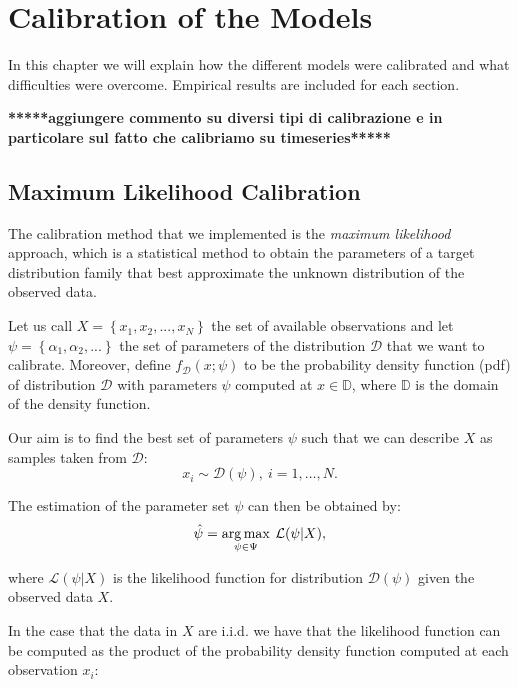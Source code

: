 \chapter{Calibration of the Models}
\label{chpr:calibration}

In this chapter we will explain how the different models were calibrated and what difficulties were overcome. Empirical results are included for each section.

\textbf{*****aggiungere commento su diversi tipi di calibrazione e in particolare sul fatto che calibriamo su timeseries*****}
\bigskip

\section{Maximum Likelihood Calibration}
The calibration method that we implemented is the \textit{maximum likelihood} approach, which is a statistical method to obtain the parameters of a target distribution family that best approximate the unknown distribution of the observed data.

Let us call $X = \left\lbrace x_1, x_2, ... , x_N \right\rbrace$ the set of available observations and let $\psi= \left\lbrace \alpha_1, \alpha_2, ... \right\rbrace $ the set of parameters of the distribution $ \mathcal{D}$ that we want to calibrate.
Moreover, define $f_\mathcal{D} (x ; \psi)$ to be the probability density function (pdf) of distribution $\mathcal{D}$ with parameters $\psi$ computed at $x \in \mathbb{D}$, where $\mathbb{D}$ is the domain of the density function.

Our aim is to find the best set of parameters $\psi$ such that we can describe $X$ as samples taken from $\mathcal{D}$:
\begin{equation}
x_i \sim \mathcal{D} (\psi), \: i = 1, \dots, N.
\end{equation}

The estimation of the parameter set $\psi$ can then be obtained by:
\begin{equation}
	\hat{\psi} = \operatorname*{arg\,max}_{\psi \in \Psi} \:\mathcal{L}(\psi |  X),
\end{equation}

where $\mathcal{L}(\psi |  X)$ is the likelihood function for distribution $\mathcal{D}(\psi)$ given the observed data $X$.

In the case that the data in $X$ are i.i.d. we have that the likelihood function can be computed as the product of the probability density function computed at each observation $x_i$:

